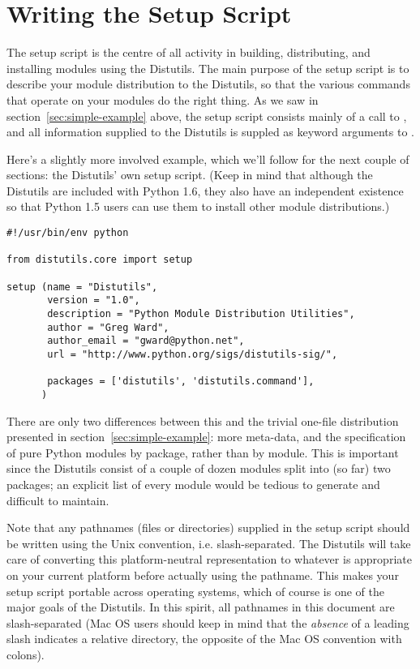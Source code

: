 \documentclass{howto}
\begin{document}
\section{Writing the Setup Script}
\label{sec:setup-script}

The setup script is the centre of all activity in building,
distributing, and installing modules using the Distutils.  The main
purpose of the setup script is to describe your module distribution to
the Distutils, so that the various commands that operate on your modules
do the right thing.  As we saw in section~\ref{sec:simple-example}
above, the setup script consists mainly of a call to ,
and all information supplied to the Distutils is suppled as keyword
arguments to .

Here's a slightly more involved example, which we'll follow for the next
couple of sections: the Distutils' own setup script.  (Keep in mind that
although the Distutils are included with Python 1.6, they also have an
independent existence so that Python 1.5 users can use them to install
other module distributions.)

\begin{verbatim}
#!/usr/bin/env python

from distutils.core import setup

setup (name = "Distutils",
       version = "1.0",
       description = "Python Module Distribution Utilities",
       author = "Greg Ward",
       author_email = "gward@python.net",
       url = "http://www.python.org/sigs/distutils-sig/",

       packages = ['distutils', 'distutils.command'],
      )
\end{verbatim}
There are only two differences between this and the trivial one-file
distribution presented in section~\ref{sec:simple-example}: more
meta-data, and the specification of pure Python modules by package,
rather than by module.  This is important since the Distutils consist of
a couple of dozen modules split into (so far) two packages; an explicit
list of every module would be tedious to generate and difficult to
maintain.

Note that any pathnames (files or directories) supplied in the setup
script should be written using the Unix convention, i.e.
slash-separated.  The Distutils will take care of converting this
platform-neutral representation to whatever is appropriate on your
current platform before actually using the pathname.  This makes your
setup script portable across operating systems, which of course is one
of the major goals of the Distutils.  In this spirit, all pathnames in
this document are slash-separated (Mac OS users should keep in mind that
the \emph{absence} of a leading slash indicates a relative directory,
the opposite of the Mac OS convention with colons).
\end{document}
